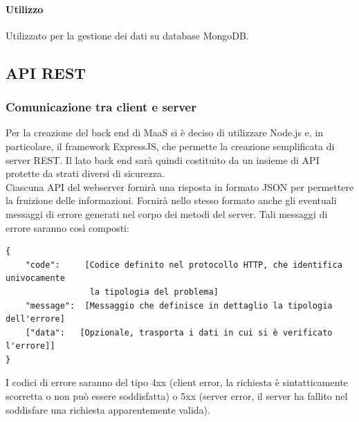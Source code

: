 \paragraph*{Utilizzo}
Utilizzato per la gestione dei dati su database MongoDB.

\subsection{API REST}
\subsubsection{Comunicazione tra client e server}
Per la creazione del back end di MaaS si è deciso di utilizzare Node.js e, in particolare, il framework ExpressJS, che permette la creazione semplificata di server REST. Il lato back end sarà quindi costituito da un insieme di API protette da strati diversi di sicurezza. \\
Ciascuna API del webserver fornirà una risposta in formato JSON per permettere la fruizione delle informazioni. Fornirà nello stesso formato anche gli eventuali messaggi di errore generati nel corpo dei metodi del server. Tali messaggi di errore saranno così composti: 
\begin{verbatim}
{
    "code":     [Codice definito nel protocollo HTTP, che identifica univocamente
                 la tipologia del problema]
    "message":  [Messaggio che definisce in dettaglio la tipologia dell'errore]
    ["data":   [Opzionale, trasporta i dati in cui si è verificato l'errore]]
}
\end{verbatim}
I codici di errore saranno del tipo 4xx (client error, la richiesta è sintatticamente scorretta o non può essere soddisfatta) o 5xx (server error, il server ha fallito nel soddisfare una richiesta apparentemente valida).
